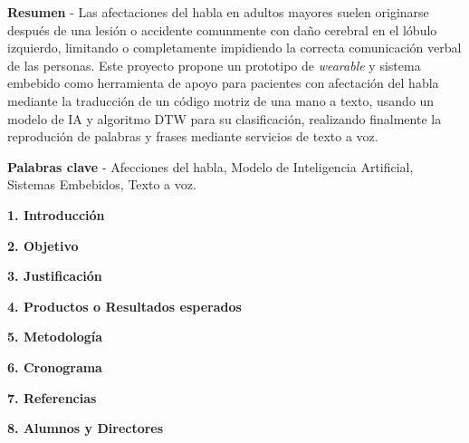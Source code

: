 \documentclass[10.5pt]{report}
\begin{document}


\hfill\break
\justifying
\textbf{Resumen} - Las afectaciones del habla en adultos mayores suelen originarse después de una lesión o accidente comunmente con daño cerebral en el lóbulo izquierdo, limitando o completamente impidiendo la correcta comunicación verbal de las personas. Este proyecto propone un prototipo de \textit{wearable} y sistema embebido como herramienta de apoyo para pacientes con afectación del habla mediante la traducción de un código motriz de una mano a texto, usando un modelo de IA y algoritmo DTW para su clasificación, realizando finalmente la reprodución de palabras y frases mediante servicios de texto a voz.

\hfill \break
\textbf{Palabras clave} - Afecciones del habla, Modelo de Inteligencia Artificial, Sistemas Embebidos, Texto a voz.

\hfill \break
{\fontsize{12}{14}\textbf{1. Introducción}}
\hfill \break

\newpage

\hfill \break
{\fontsize{12}{14}\textbf{2. Objetivo}}
\hfill \break
\justifying


\hfill \break
{\fontsize{12}{14}\textbf{3. Justificación}}
\hfill \break
\justifying


\hfill \break
{\fontsize{12}{14}\textbf{4. Productos o Resultados esperados}}
\hfill \break
\justifying


\hfill \break
{\fontsize{12}{14}\textbf{5. Metodología}}
\hfill \break
\justifying


\newpage
\hfill \break
{\fontsize{12}{14}\textbf{6. Cronograma}}
\hfill \break
\justifying


\newpage
\hfill \break
{\fontsize{12}{14}\textbf{7. Referencias}}

\hfill \break


\newpage

{\fontsize{12}{14}\textbf{8. Alumnos y Directores}}


\end{document}
